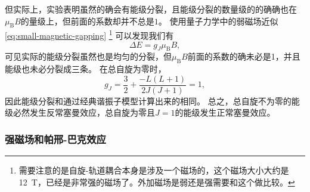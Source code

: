 \documentclass[UTF8, a4paper]{ctexart}
\begin{document}
但实际上，实验表明虽然的确会有能级分裂，且能级分裂的数量级的的确确也在$\mu_\text{B} B$的量级上，但前面的系数却并不总是$1$。
使用量子力学中的弱磁场近似\eqref{eq:small-magnetic-gapping}%
\footnote{
    需要注意的是自旋-轨道耦合本身是涉及一个磁场的，这个磁场大小大约是\SI{12}{T}，已经是非常强的磁场了。外加磁场是弱还是强需要和这个做比较。
}%
可以发现我们有
\begin{equation}
    \Delta E = g_J \mu_\text{B} B,
\end{equation}
可见实际的能级分裂虽然也是均匀的分裂，但$\mu_\text{B} B$前面的系数的确未必是1，并且能级也未必分裂成三条。
在总自旋为零时，
\[
    g_J = \frac{3}{2} + \frac{-L(L+1)}{2J(J+1)} = 1,
\]
因此能级分裂和通过经典谐振子模型计算出来的相同。
总之，总自旋不为零的能级必然发生反常塞曼效应，总自旋为零且$J=1$的能级发生正常塞曼效应。

\subsubsection{强磁场和帕邢-巴克效应}
\end{document}
